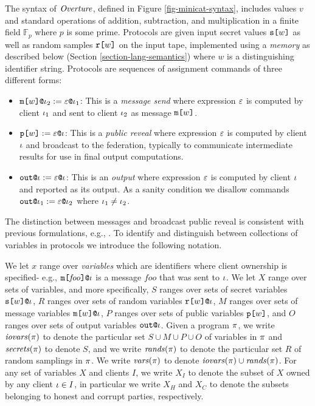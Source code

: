 The syntax of $\mathit{Overture}$, defined in Figure \ref{fig-minicat-syntax},
includes values $v$ and standard operations of addition, subtraction,
and multiplication in a finite field $\mathbb{F}_p$ where $p$ is some
prime.  Protocols are given input secret values $\texttt{s[}w\texttt{]}$ as well
as random samples $\texttt{r[}w\texttt{]}$ on the input tape, implemented using a
\emph{memory} as described below (Section
\ref{section-lang-semantics}) where $w$ is a distinguishing 
identifier string. Protocols are sequences of assignment commands of three
different forms:
\begin{itemize}
\item $\texttt{m[}w\texttt{]}\texttt{@}\iota_2 := \varepsilon\texttt{@}\iota_1$: This
  is a \emph{message send} where expression $\varepsilon$ is computed
  by client $\iota_1$ and sent to client $\iota_2$ as message
  $\texttt{m[}w\texttt{]}$.
\item $\texttt{p[}w\texttt{]} := \varepsilon\texttt{@}\iota$: This
  is a \emph{public reveal} where expression $\varepsilon$ is computed
  by client $\iota$ and broadcast to the federation, typically
  to communicate intermediate results for use in final output
  computations.
\item $\texttt{out}\texttt{@}\iota := \varepsilon\texttt{@}\iota$: This
  is an \emph{output} where expression $\varepsilon$ is computed
  by client $\iota$ and reported as its output. As a
  sanity condition we disallow commands
  $\texttt{out}\texttt{@}\iota_1 := \varepsilon\texttt{@}\iota_2$ where $\iota_1\ne\iota_2$.
\end{itemize}
The distinction between
messages and broadcast public reveal is consistent with previous
formulations, e.g., \cite{6266151}. To identify and distinguish
between collections of variables in protocols we introduce the
following notation.
\begin{definition}
We let $x$ range over \emph{variables} which are identifiers where
client ownership is specified- e.g.,
$\texttt{m[}\mathit{foo}\texttt{]}\texttt{@}\iota$ is a message $\mathit{foo}$ that
was sent to $\iota$. We let $X$ range over sets of variables, and more
specifically, $S$ ranges over sets of secret variables
$\texttt{s[}w\texttt{]}\texttt{@}\iota$, $R$ ranges over sets of random variables
$\texttt{r[}w\texttt{]}\texttt{@}\iota$, $M$ ranges over sets of message variables
$\texttt{m[}w\texttt{]}\texttt{@}\iota$, $P$ ranges over sets of public variables
$\texttt{p[}w\texttt{]}$, and $O$ ranges over sets of output variables $\texttt{out}\texttt{@}\iota$.
Given a program $\pi$, we write $\mathit{iovars}(\pi)$ to denote the
particular set $S \cup M \cup P \cup O$ of variables in $\pi$ and
$\mathit{secrets}(\pi)$ to denote $S$, and we write $\mathit{rands}(\pi)$ to
denote the particular set $R$ of random samplings in $\pi$. We write
$\mathit{vars}(\pi)$ to denote $\mathit{iovars}(\pi) \cup \mathit{rands}(\pi)$. For any set
of variables $X$ and clients $I$, we write $X_I$ to denote the subset
of $X$ owned by any client $\iota \in I$, in particular we write $X_H$
and $X_C$ to denote the subsets belonging to honest and corrupt
parties, respectively.
\end{definition}

